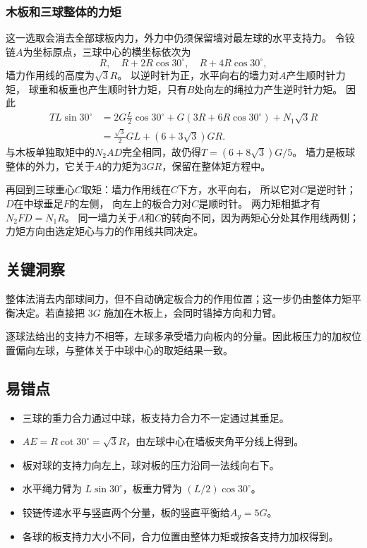 \documentclass[UTF8,fontset=fandol,a4paper,11pt]{ctexart}
\begin{document}
\subsubsection*{木板和三球整体的力矩}
这一选取会消去全部球板内力，外力中仍须保留墙对最左球的水平支持力。
令铰链$A$为坐标原点，三球中心的横坐标依次为
\[
R,\quad R+2R\cos30^\circ,\quad R+4R\cos30^\circ,
\]
墙力作用线的高度为$\sqrt3R$。
以逆时针为正，水平向右的墙力对$A$产生顺时针力矩，
球重和板重也产生顺时针力矩，只有$B$处向左的绳拉力产生逆时针力矩。
因此
\[
\begin{aligned}
TL\sin30^\circ
&=2G\frac L2\cos30^\circ+G(3R+6R\cos30^\circ)+N_1\sqrt3R\\
&=\frac{\sqrt3}{2}GL+(6+3\sqrt3)GR.
\end{aligned}
\]
与木板单独取矩中的$N_2AD$完全相同，故仍得$T=(6+8\sqrt3)G/5$。
墙力是板球整体的外力，它关于$A$的力矩为$3GR$，保留在整体矩方程中。

再回到三球重心$C$取矩：墙力作用线在$C$下方，水平向右，
所以它对$C$是逆时针；$D$在中球垂足$F$的左侧，
向左上的板合力对$C$是顺时针。
两力矩相抵才有$N_2FD=N_1R$。
同一墙力关于$A$和$C$的转向不同，因为两矩心分处其作用线两侧；
力矩方向由选定矩心与力的作用线共同决定。




\subsection*{关键洞察}

整体法消去内部球间力，但不自动确定板合力的作用位置；这一步仍由整体力矩平衡决定。若直接把 $3G$ 施加在木板上，会同时错掉方向和力臂。

逐球法给出的支持力不相等，左球多承受墙力向板内的分量。因此板压力的加权位置偏向左球，与整体关于中球中心的取矩结果一致。



\subsection*{易错点}

\begin{itemize}\item 三球的重力合力通过中球，板支持力合力不一定通过其垂足。\item $AE=R\cot30^\circ=\sqrt3R$，由左球中心在墙板夹角平分线上得到。\item 板对球的支持力向左上，球对板的压力沿同一法线向右下。\item 水平绳力臂为 $L\sin30^\circ$，板重力臂为 $(L/2)\cos30^\circ$。\item 铰链传递水平与竖直两个分量，板的竖直平衡给$A_y=5G$。\item 各球的板支持力大小不同，合力位置由整体力矩或按各支持力加权得到。\end{itemize}
\end{document}
